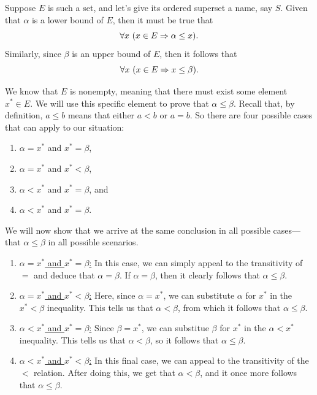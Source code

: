 \vspace{2mm}
\solve
Suppose $E$ is such a set, and let's give its ordered superset a name, say $S$.
Given that $\alpha$ is a lower bound of $E$, then it must be true that
$$\forall x ~(x \in E \Rightarrow \alpha \leq x).$$
Similarly, since $\beta$ is an upper bound of $E$, then it follows that
$$\forall x~ (x \in E \Rightarrow x \leq \beta).$$

We know that $E$ is nonempty, meaning that there must exist some element $x^* \in E$.
We will use this specific element to prove that $\alpha \leq \beta$.
Recall that, by definition, $a \leq b$ means that either $a < b$ or $a = b$.
So there are four possible cases that can apply to our situation:
\begin{enumerate}[label=(\alph*)]
    \item $\alpha = x^*$ and $x^* = \beta$,
    \item $\alpha = x^*$ and $x^* < \beta$,
    \item $\alpha < x^*$ and $x^* = \beta$, and
    \item $\alpha < x^*$ and $x^* = \beta$.
\end{enumerate}

We will now show that we arrive at the same conclusion in all possible cases—that $\alpha \leq \beta$ in all possible scenarios.

\begin{enumerate}[label=(\alph*)]
    \item \underline{$\alpha = x^*$ and $x^* = \beta$:} In this case, we can simply appeal to the transitivity of $=$ and deduce that $\alpha = \beta$.
    If $\alpha = \beta$, then it clearly follows that $\alpha \leq \beta$.
    \item \underline{$\alpha = x^*$ and $x^* < \beta$:} Here, since $\alpha = x^*$, we can substitute $\alpha$ for $x^*$ in the $x^* < \beta$ inequality.
    This tells us that $\alpha < \beta$, from which it follows that $\alpha \leq \beta$.
    \item \underline{$\alpha < x^*$ and $x^* = \beta$:} Since $\beta = x^*$, we can substitue $\beta$ for $x^*$ in the $\alpha < x^*$ inequality.
    This tells us that $\alpha < \beta$, so it follows that $\alpha \leq \beta$.
    \item \underline{$\alpha < x^*$ and $x^* < \beta$:} In this final case, we can appeal to the transitivity of the $<$ relation.
    After doing this, we get that $\alpha < \beta$, and it once more follows that $\alpha \leq \beta$.
\end{enumerate}

